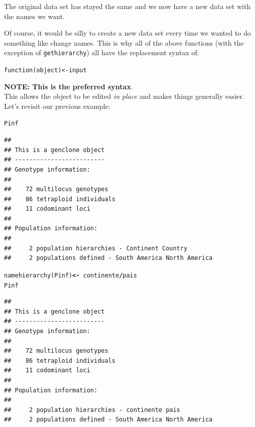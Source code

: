 \documentclass[letterpaper]{article}\usepackage[]{graphicx}\usepackage[]{color}
\makeatletter
\newcommand{\hlopt}[1]{\textcolor[rgb]{1,0,0.502}{\textbf{#1}}}%
\newcommand{\hlstd}[1]{\textcolor[rgb]{0,0,0}{#1}}%
\newcommand{\hlkwb}[1]{\textcolor[rgb]{0.502,0.502,0.753}{\textbf{#1}}}%
\newcommand{\hlkwd}[1]{\textcolor[rgb]{0,0.267,0.4}{#1}}%
\newenvironment{kframe}{%
 \def\at@end@of@kframe{}%
 \ifinner\ifhmode%
  \def\at@end@of@kframe{\end{minipage}}%
  \begin{minipage}{\columnwidth}%
 \fi\fi%
 \def\FrameCommand##1{\hskip\@totalleftmargin \hskip-\fboxsep
 \colorbox{shadecolor}{##1}\hskip-\fboxsep
     \hskip-\linewidth \hskip-\@totalleftmargin \hskip\columnwidth}%
 \MakeFramed {\advance\hsize-\width
   \@totalleftmargin\z@ \linewidth\hsize
   \@setminipage}}%
 {\par\unskip\endMakeFramed%
 \at@end@of@kframe}
\newenvironment{knitrout}{}{} %
\makeatother
\begin{document}
\noindent
The original data set has stayed the same and we now have a new data set with the
names we want.

Of course, it would be silly to create a new data set every time we wanted to
do something like change names. This is why all of the above functions (with the
exception of \texttt{gethierarchy}) all have the replacement syntax of:
\begin{knitrout}\footnotesize
{}\color{fgcolor}\begin{kframe}
\begin{alltt}
\hlkwd{function}(object) <- input
\end{alltt}
\end{kframe}
\end{knitrout}

\noindent
\textbf{NOTE: This is the preferred syntax}.\\ 
\noindent
This allows the object to be edited \textit{in place} and makes things generally
easier. Let's revisit our previous example:
\begin{knitrout}\footnotesize
{}\color{fgcolor}\begin{kframe}
\begin{alltt}
\hlstd{Pinf}
\end{alltt}
\begin{verbatim}
## 
## This is a genclone object
## -------------------------
## Genotype information:
## 
##    72 multilocus genotypes
##    86 tetraploid individuals
##    11 codominant loci
## 
## Population information:
## 
##     2 population hierarchies - Continent Country
##     2 populations defined - South America North America
\end{verbatim}
\begin{alltt}
\hlkwd{namehierarchy}\hlstd{(Pinf)} \hlkwb{<-} \hlopt{~}\hlstd{continente}\hlopt{/}\hlstd{pais}
\hlstd{Pinf}
\end{alltt}
\begin{verbatim}
## 
## This is a genclone object
## -------------------------
## Genotype information:
## 
##    72 multilocus genotypes
##    86 tetraploid individuals
##    11 codominant loci
## 
## Population information:
## 
##     2 population hierarchies - continente pais
##     2 populations defined - South America North America
\end{verbatim}
\end{kframe}
\end{knitrout}
\end{document}
